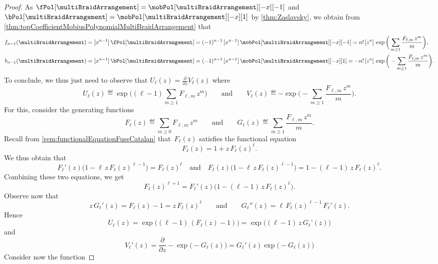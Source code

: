 \begin{proof}
As $\fPol[{\multiBraidArrangement}] = \mobPol[{\multiBraidArrangement}][-x][-1]$ and $\bPol[{\multiBraidArrangement}] = \mobPol[{\multiBraidArrangement}][-x][1]$ by \cref{thm:Zaslavsky}, we obtain from \cref{thm:topCoefficientMobiusPolynomialMultiBraidArrangement} that
\begin{align*}
f_{n-1}(\multiBraidArrangement) & = [x^{n-1}] \, \fPol[{\multiBraidArrangement}] = (-1)^{n-1} \, [x^{n-1}] \, \mobPol[{\multiBraidArrangement}][-x][-1] = n! \, [z^n]  \, \exp \bigg( \sum_{m \ge 1} \frac{F_{\ell,m} \, z^m}{m} \bigg), \\
b_{n-1}(\multiBraidArrangement) & = [x^{n-1}] \, \bPol[{\multiBraidArrangement}] = (-1)^{n-1} \, [x^{n-1}] \, \mobPol[{\multiBraidArrangement}][-x][1] = - n! \, [z^n]  \, \exp \bigg( - \sum_{m \ge 1} \frac{F_{\ell,m} \, z^m}{m} \bigg).
\end{align*}
To conclude, we thus just need to observe that
\(
U_\ell(z) = \frac{\partial}{\partial z} V_\ell(z)
\)
where
\[
U_\ell(z) \eqdef \exp \bigg( (\ell-1) \sum_{m \ge 1} F_{\ell,m} \, z^m \bigg)
\qquad\text{and}\qquad
V_\ell(z) \eqdef - \exp \bigg( - \sum_{m \ge 1} \frac{F_{\ell,m} \, z^m}{m} \bigg).
\]
For this, consider the generating functions
\[
F_\ell(z) \eqdef \sum_{m \ge 0} F_{\ell,m} \, z^m
\qquad\text{and}\qquad
G_\ell(z) \eqdef \sum_{m \ge 1} \frac{F_{\ell,m} \, z^m}{m}.
\]
Recall from \cref{rem:functionalEquationFussCatalan} that~$F_\ell(z)$ satisfies the functional equation
\[
F_\ell(z) = 1 + z \, F_\ell(z)^\ell.
\]
We thus obtain that
\[
F_\ell'(z) \big( 1 - \ell \, z \, F_\ell(z)^{\ell-1} \big) = F_\ell(z)^\ell
\quad\text{and}\quad
F_\ell(z) \big( 1 - \ell \, z \, F_\ell(z)^{\ell-1} \big) = 1 - (\ell-1) \, z \, F_\ell(z)^\ell.
\]
Combining these two equations, we get
\begin{equation}
\label{eq:diff}
F_\ell(z)^{\ell+1} = F_\ell'(z) \big( 1 - (\ell-1) \, z \, F_\ell(z)^\ell \big).
\end{equation}
Observe now that
\begin{equation}
\label{eq:GF}
z \, G_\ell'(z) = F_\ell(z) - 1 = z \, F_\ell(z)^\ell
\qquad\text{and}\qquad
G_\ell''(z) = \ell \, F_\ell(z)^{\ell-1} \, F_\ell'(z).
\end{equation}
Hence
\[
U_\ell(z) = \exp \big( (\ell-1) \, (F_\ell(z) - 1) \big) = \exp \big( (\ell-1) \, z \, G_\ell’(z) \big)
\]
and
\[
V_\ell'(z) = \frac{\partial}{\partial z}  - \exp \big( \! - G_\ell(z) \big) = G_\ell'(z) \exp \big( -G_\ell(z) \big)
\]
Consider now the function

\end{proof}
